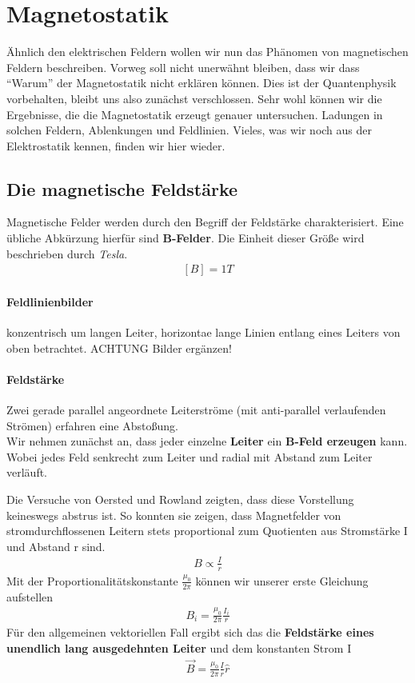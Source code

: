 \section{Magnetostatik}
Ähnlich den elektrischen Feldern wollen wir nun das Phänomen von magnetischen Feldern beschreiben.
Vorweg soll nicht unerwähnt bleiben, dass wir dass "`Warum"' der Magnetostatik nicht erklären können. Dies ist der Quantenphysik vorbehalten, bleibt uns also zunächst verschlossen.
Sehr wohl können wir die Ergebnisse, die die Magnetostatik erzeugt genauer untersuchen. Ladungen in solchen Feldern, Ablenkungen und Feldlinien. Vieles, was wir noch aus der Elektrostatik kennen, finden wir hier wieder.

\subsection{Die  magnetische Feldstärke}
Magnetische Felder werden durch den Begriff der Feldstärke charakterisiert. Eine übliche Abkürzung hierfür sind \textbf{B-Felder}. Die Einheit dieser Größe wird beschrieben durch \textit{Tesla}. \begin{align} \label{eqn:EinheitTesla}
\left[B \right] = 1T
\end{align}
\paragraph{Feldlinienbilder} konzentrisch um langen Leiter, horizontae lange Linien entlang eines Leiters von oben betrachtet. ACHTUNG Bilder ergänzen!

\paragraph{Feldstärke} Zwei gerade parallel angeordnete Leiterströme (mit anti-parallel verlaufenden Strömen) erfahren eine Abstoßung. \\
Wir nehmen zunächst an, dass jeder einzelne \textbf{Leiter} ein\textbf{ B-Feld erzeugen} kann. Wobei jedes Feld senkrecht zum Leiter und radial mit Abstand zum Leiter verläuft. 

Die Versuche von Oersted und Rowland zeigten, dass diese Vorstellung keineswegs abstrus ist. So konnten sie zeigen, dass Magnetfelder von stromdurchflossenen Leitern stets proportional zum Quotienten aus Stromstärke I und Abstand  r sind.
\begin{align*}
B \propto \frac{I}{r}
\end{align*}
Mit der  Proportionalitätskonstante $\frac{\mu_0}{2\pi}$ können wir unserer erste Gleichung aufstellen
\begin{align} \label{eqn:magFeldstärke}
B_i = \frac{\mu_0}{2\pi} \frac{I_i}{r}
\end{align}
Für den allgemeinen vektoriellen Fall ergibt sich das die \textbf{Feldstärke eines unendlich lang ausgedehnten Leiter} und dem konstanten Strom I
\begin{align} \label{def:magFeldstärke}
\boxed{\vec{B} = \frac{\mu_0}{2\pi} \frac{I}{r} \hat{r}}
\end{align}
